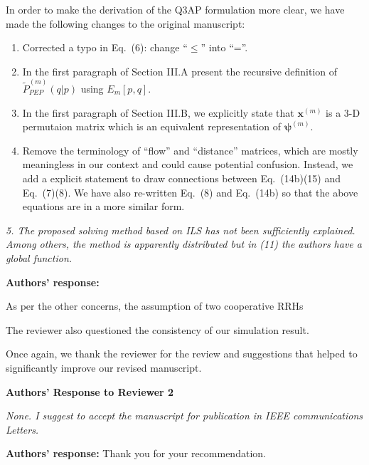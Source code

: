 \documentclass[onecolumn, 11pt, draftclsnofoot]{IEEEtran}
\begin{document}
In order to make the derivation of the Q3AP formulation more clear, we have made
the following changes to the original manuscript:
\begin{enumerate}
  \item Corrected a typo in Eq.~(6): change ``$\leq$'' into ``=''.
  \item In the first paragraph of Section III.A present the recursive definition
  of $\tilde{P}_{PEP}^{(m)}(q|p)$ using $E_m[p,q]$.
  \item In the first paragraph of Section III.B, we explicitly state that
  $\mathbf{x}^{(m)}$ is a 3-D permutaion matrix which is an equivalent
  representation of $\bm{\psi}^{(m)}$.
  \item Remove the terminology of ``flow'' and ``distance'' matrices, which are
  mostly meaningless in our context and could cause potential confusion.
  Instead, we add a explicit statement to draw connections between Eq.~(14b)(15)
  and Eq.~(7)(8). We have also re-written Eq.~(8) and Eq.~(14b) so that the
  above equations are in a more similar form.
\end{enumerate}

\vspace{0.5cm}

\noindent
\emph{5. The proposed solving method based on ILS has not been sufficiently
explained. Among others, the method is apparently distributed but in (11) the
authors have a global function.}

\noindent \textbf{Authors' response:}

\vspace{0.5cm}


As per the other concerns, the assumption of two cooperative RRHs

The reviewer also questioned the consistency of our simulation result.

Once again, we thank the reviewer for the review and suggestions that helped to
significantly improve our revised manuscript.



\newpage
\begin{center}
{\LARGE \textbf{Authors' Response to Reviewer 2}}
\end{center}

\noindent
\emph{None. I suggest to accept the manuscript for publication in IEEE
communications Letters.}

\noindent \textbf{Authors' response:}
Thank you for your recommendation.

\vspace{0.5cm}



\end{document}
